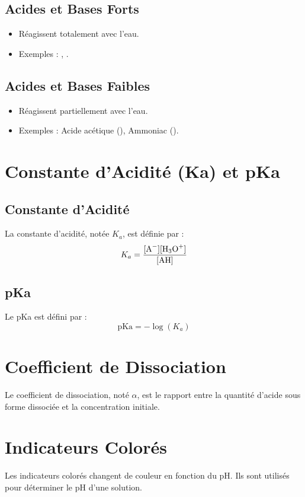 \documentclass[12pt]{article}
\begin{document}
\subsection{Acides et Bases Forts}
\begin{itemize}
    \item Réagissent totalement avec l'eau.
    \item Exemples : , .
\end{itemize}

\subsection{Acides et Bases Faibles}
\begin{itemize}
    \item Réagissent partiellement avec l'eau.
    \item Exemples : Acide acétique (), Ammoniac ().
\end{itemize}

\section{Constante d'Acidité (Ka) et pKa}
\subsection{Constante d'Acidité}
La constante d'acidité, notée \(K_a\), est définie par :
\[
K_a = \frac{[\ce{A-}][\ce{H3O+}]}{[\ce{AH}]}
\]

\subsection{pKa}
Le pKa est défini par :
\[
\text{pKa} = -\log(K_a)
\]

\section{Coefficient de Dissociation}
Le coefficient de dissociation, noté \(\alpha\), est le rapport entre la quantité d'acide sous forme dissociée et la concentration initiale.

\section{Indicateurs Colorés}
Les indicateurs colorés changent de couleur en fonction du pH. Ils sont utilisés pour déterminer le pH d'une solution.
\end{document}
